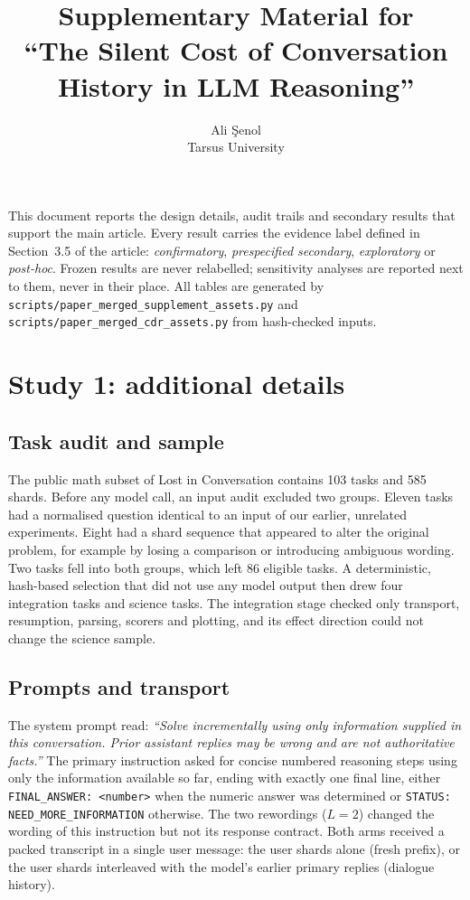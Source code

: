 \documentclass[10pt]{article}
\title{Supplementary Material for\\ ``The Silent Cost of Conversation History in
LLM Reasoning''}
\author{Ali \c{S}enol\\Tarsus University}
\date{}
\begin{document}
\sloppy
\maketitle

\noindent This document reports the design details, audit trails and secondary
results that support the main article. Every result carries the evidence label
defined in Section~3.5 of the article: \emph{confirmatory},
\emph{prespecified secondary}, \emph{exploratory} or \emph{post-hoc}. Frozen
results are never relabelled; sensitivity analyses are reported next to them,
never in their place. All tables are generated by
\texttt{scripts/paper\_merged\_supplement\_assets.py} and
\texttt{scripts/paper\_merged\_cdr\_assets.py} from hash-checked inputs.

\tableofcontents

\section{Study 1: additional details}

\subsection{Task audit and sample}
The public math subset of Lost in Conversation contains 103 tasks and 585
shards. Before any model call, an input audit excluded two groups. Eleven tasks
had a normalised question identical to an input of our earlier, unrelated
experiments. Eight had a shard sequence that appeared to alter the original
problem, for example by losing a comparison or introducing ambiguous wording.
Two tasks fell into both groups, which left 86 eligible tasks. A deterministic,
hash-based selection that did not use any model output then drew four
integration tasks and \nTasks{} science tasks. The integration stage checked
only transport, resumption, parsing, scorers and plotting, and its effect
direction could not change the science sample.

\subsection{Prompts and transport}
The system prompt read: \emph{``Solve incrementally using only information
supplied in this conversation. Prior assistant replies may be wrong and are
not authoritative facts.''} The primary instruction asked for concise numbered
reasoning steps using only the information available so far, ending with
exactly one final line, either \texttt{FINAL\_ANSWER: <number>} when the
numeric answer was determined or \texttt{STATUS: NEED\_MORE\_INFORMATION}
otherwise. The two rewordings ($L=2$) changed the wording of this instruction
but not its response contract. Both arms received a packed transcript in a
single user message: the user shards alone (fresh prefix), or the user shards
interleaved with the model's earlier primary replies (dialogue history).
\end{document}
